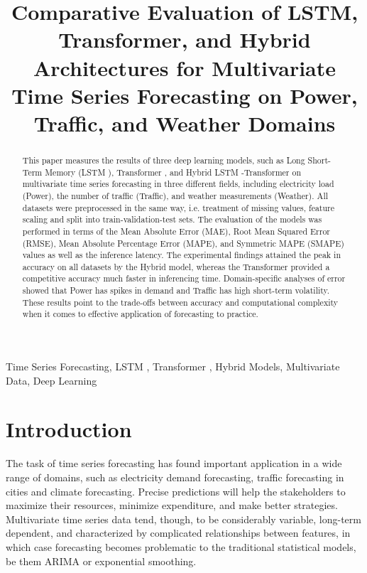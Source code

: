\documentclass[conference]{IEEEtran}
\begin{document}
\title{Comparative Evaluation of LSTM, Transformer, and Hybrid Architectures for Multivariate Time Series Forecasting on Power, Traffic, and Weather Domains}

\author{
}

\maketitle

\begin{abstract}
This paper measures the results of three deep learning models, such as Long Short-Term Memory (LSTM \cite{hochreiter1997lstm}), Transformer \cite{vaswani2017attention}, and Hybrid \cite{wu2020deep} LSTM \cite{hochreiter1997lstm}-Transformer \cite{vaswani2017attention} on multivariate time series forecasting in three different fields, including electricity load (Power), the number of traffic (Traffic), and weather measurements (Weather). All datasets were preprocessed in the same way, i.e. treatment of missing values, feature scaling and split into train-validation-test sets. The evaluation of the models was performed in terms of the Mean Absolute Error (MAE), Root Mean Squared Error (RMSE), Mean Absolute Percentage Error (MAPE), and Symmetric MAPE (SMAPE) values as well as the inference latency. The experimental findings attained the peak in accuracy on all datasets by the Hybrid \cite{wu2020deep} model, whereas the Transformer \cite{vaswani2017attention} provided a competitive accuracy much faster in inferencing time. Domain-specific analyses of error showed that Power has spikes in demand and Traffic has high short-term volatility. These results point to the trade-offs between accuracy and computational complexity when it comes to effective application of forecasting to practice.
\end{abstract}

\begin{IEEEkeywords}
Time Series Forecasting, LSTM \cite{hochreiter1997lstm}, Transformer \cite{vaswani2017attention}, Hybrid \cite{wu2020deep} Models, Multivariate Data, Deep Learning
\end{IEEEkeywords}

\section{Introduction}
The task of time series forecasting has found important application in a wide range of domains, such as electricity demand forecasting, traffic forecasting in cities and climate forecasting. Precise predictions will help the stakeholders to maximize their resources, minimize expenditure, and make better strategies. Multivariate time series data tend, though, to be considerably variable, long-term dependent, and characterized by complicated relationships between features, in which case forecasting becomes problematic to the traditional statistical models, be them ARIMA or exponential smoothing.
\end{document}
